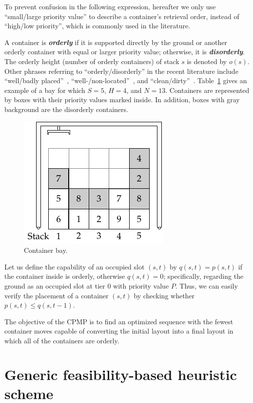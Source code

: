 \documentclass[review,3p,times,12pt,number]{elsarticle}\usepackage{amsmath}\usepackage{amssymb}
\renewcommand{\emph}[1]{\textbf{\textit{#1}}}
\begin{document}
To prevent confusion in the following expression, hereafter we only use ``small{\slash}large priority value'' to describe a container's retrieval order, instead of ``high{\slash}low priority'', which is commonly used in the literature.

A container is \emph{orderly} if it is supported directly by the ground or another orderly container with equal or larger priority value; otherwise, it is \emph{disorderly}. The orderly height (number of orderly containers) of stack $s$ is denoted by $o(s)$. Other phrases referring to ``orderly{\slash}disorderly'' in the recent literature include ``well{\slash}badly placed''~\citep{bort2012}, ``well-{\slash}non-located''~\citep{exp2012}, and ``clean{\slash}dirty''~\citep{wang2015}. Table~\ref{fig:bay} gives an example of a bay for which $S=5$, $H=4$, and $N=13$. Containers are represented by boxes with their priority values marked inside. In addition, boxes with gray background are the disorderly containers.


\begin{figure}[htbp]
\centering
\includegraphics{figs/bay.pdf}
\caption{Container bay.}
\label{fig:bay}
\end{figure}

Let us define the capability of an occupied slot $(s,t)$ by $q(s,t)=p(s,t)$ if the container inside is orderly, otherwise $q(s,t)=0$; specifically, regarding the ground as an occupied slot at tier $0$ with priority value $P$. Thus, we can easily verify the placement of a container $(s,t)$ by checking whether $p(s,t)\le q(s,t-1)$.



The objective of the CPMP is to find an optimized sequence with the fewest container moves capable of converting  the initial layout into a final layout in which all of the containers are orderly.

\section{Generic feasibility-based heuristic scheme}
\label{sec:scheme}
\end{document}
